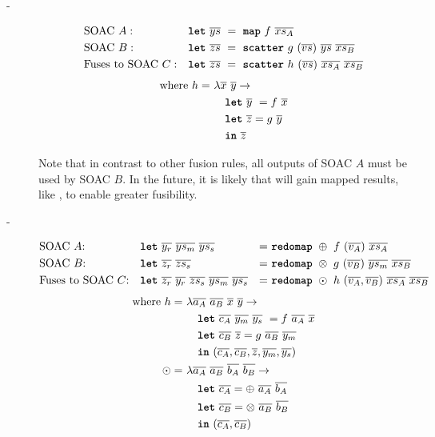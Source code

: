 \begin{description}
\item[-]
  \begin{align*}
    &\mbox{SOAC}~A: &\hfill & \kw{let}~\seq{ys}~=~\kw{map}~f~\seq{xs_{A}}\\
    &\mbox{SOAC}~B: &\hfill & \kw{let}~\seq{zs}~=~\kw{scatter}~g~(\seq{vs})~\seq{ys}~\seq{xs_{B}} \\
    &\mbox{Fuses to SOAC}~C: &\hfill& \kw{let}~\seq{zs}~=~\kw{scatter}~h~(\seq{vs})~\seq{xs_{A}}~\seq{xs_{B}} \\
  \end{align*}
  \begin{align*}
    \text{where}~h =~& \lambda \overline{x}~\overline{y} \rightarrow \\
      & \quad \mbox{\texttt{\bfseries{let}}}~\overline{y}~ = f~\overline{x} \\
      & \quad \mbox{\texttt{\bfseries{let}}}~\overline{z} = g~\overline{y} \\
      & \quad \mbox{\texttt{\bfseries{in}}}~\overline{z}
  \end{align*}

  Note that in contrast to other fusion rules, all outputs of SOAC $A$
  must be used by SOAC $B$.  In the future, it is likely that
   will gain mapped results, like , to enable
  greater fusibility.

\item[-]
  \begin{align*}
    &\mbox{SOAC $A$:} &\hfill& \kw{let}~\seq{y_{r}}~\seq{ys_{m}}~\seq{ys_{s}}&=~&\kw{redomap}~\oplus~f~(\seq{v_{A}})~\seq{xs_{A}} \\
    &\mbox{SOAC $B$:} &\hfill& \kw{let}~\seq{z_{r}}~\seq{zs_{s}}&=~&\kw{redomap}~\otimes~g~(\seq{v_{B}})~\seq{ys_{m}}~\seq{xs_{B}} \\
    &\mbox{Fuses to SOAC $C$:} &\hfill& \kw{let}~\seq{z_{r}}~\seq{y_{r}}~\seq{zs_{s}}~\seq{ys_{m}}~\seq{ys_{s}}&=~&\kw{redomap}~\odot~h~(\seq{v_{A}},\seq{v_{B}})~\seq{xs_{A}}~\seq{xs_{B}}
  \end{align*}
  \begin{align*}
    \mbox{where}~h =~& \lambda \overline{a_{A}}~\overline{a_{B}}~\overline{x}~\overline{y} \rightarrow \\
      & \quad \mbox{\texttt{\bfseries{let}}}~\overline{c_{A}}~\overline{y_{m}}~\overline{y_{s}}~ = f~\overline{a_{A}}~\overline{x} \\
      & \quad \mbox{\texttt{\bfseries{let}}}~\overline{c_{B}}~\overline{z} = g~\overline{a_{B}}~\overline{y_{m}} \\
        & \quad \mbox{\texttt{\bfseries{in}}}~(\overline{c_{A}},\overline{c_{B}},\overline{z},\overline{y_{m}},\overline{y_{s}}) \\
    \odot =~& \lambda \overline{a_{A}}~\overline{a_{B}}~\overline{b_{A}}~\overline{b_{B}} \rightarrow \\
        & \quad \mbox{\texttt{\bfseries{let}}}~\overline{c_{A}} = \oplus~\overline{a_{A}}~\overline{b_{A}} \\
        & \quad \mbox{\texttt{\bfseries{let}}}~\overline{c_{B}} = \otimes~\overline{a_{B}}~\overline{b_{B}} \\
        & \quad \mbox{\texttt{\bfseries{in}}}~(\overline{c_{A}}, \overline{c_{B}})
  \end{align*}


\end{description}
